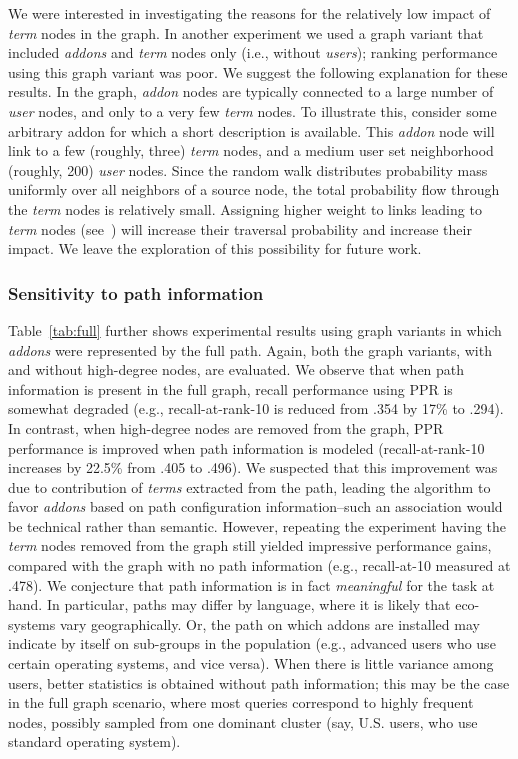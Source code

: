 \documentclass[11pt,oneside]{book}
\let\Oldsubsubsection\subsubsection
\renewcommand{\subsubsection}{\FloatBarrier\Oldsubsubsection}
\begin{document}
We were interested in investigating the reasons for the relatively low impact of {\it term} nodes in the graph. In another experiment we used a graph variant that included {\it addons} and {\it term} nodes only (i.e., without {\it users}); ranking performance using this graph variant was poor. We suggest the following explanation for these results. In the graph, {\it addon} nodes are typically connected to a large number of {\it user} nodes, and only to a very few {\it term} nodes. To illustrate this, consider some arbitrary addon for which a short description is available. This {\it addon} node will link to a few (roughly, three) {\it term} nodes, and a medium user set neighborhood (roughly, 200) {\it user} nodes. Since the random walk distributes probability mass uniformly over all neighbors of a source node, the total probability flow through the {\it term} nodes is relatively small. Assigning higher weight to links leading to {\it term} nodes (see~\citep{minkov2010improving}) will increase their traversal probability and increase their impact. We leave the exploration of this possibility for future work.

\subsubsection{Sensitivity to path information}

Table~\ref{tab:full} further shows experimental results using graph variants in which {\it addons} were represented by the full path. Again, both the graph variants, with and without high-degree nodes, are evaluated. We observe that when path information is present in the full graph, recall performance using PPR is somewhat degraded (e.g., recall-at-rank-10 is reduced from .354 by 17\% to .294). In contrast, when high-degree nodes are removed from the graph, PPR performance is improved when path information is modeled (recall-at-rank-10 increases by 22.5\% from .405 to .496). We suspected that this improvement was due to contribution of {\it terms} extracted from the path, leading the algorithm to favor {\it addons} based on path configuration information--such an association would be technical rather than semantic. However, repeating the experiment having the  {\it term} nodes removed from the graph still yielded impressive performance gains, compared with the graph with no path information (e.g., recall-at-10 measured at .478). We conjecture that path information is in fact {\it meaningful} for the task at hand. In particular, paths may differ by language, where it is likely that eco-systems vary geographically. Or, the path on which addons are installed may indicate by itself on sub-groups in the population (e.g., advanced users who use certain operating systems, and vice versa). 
When there is little variance among users, better statistics is obtained without path information; this may be the case in the full graph scenario, where most queries correspond to highly frequent nodes, possibly sampled from one dominant cluster (say, U.S. users, who use standard operating system). 
\end{document}
